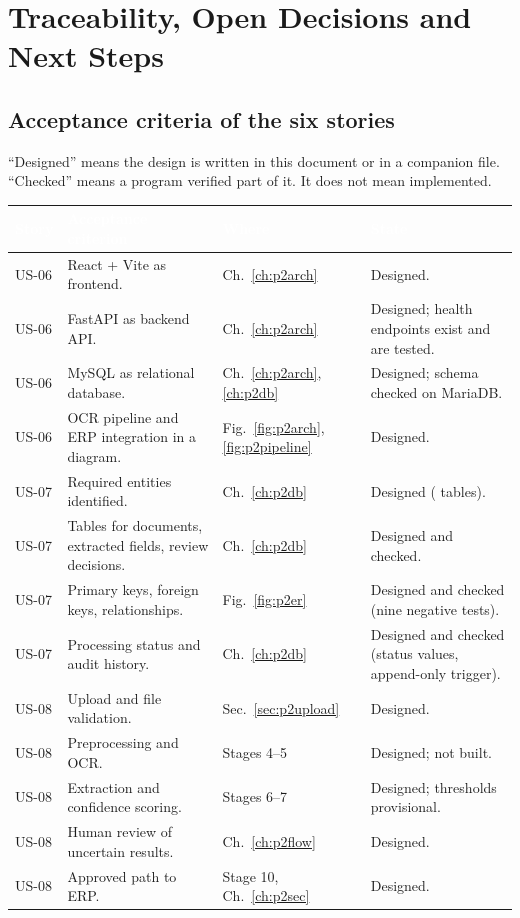 \documentclass[11pt,a4paper]{report}
\newcommand{\hdr}[1]{\textcolor{white}{\sffamily\bfseries #1}}
\newcommand{\tblstart}{\rowcolors{2}{white}{rowgray}\arrayrulecolor{teal!60}}
\newcommand{\hdrrow}{\rowcolor{navy}}
\begin{document}
\chapter{Traceability, Open Decisions and Next Steps}\label{ch:p2trace}
\section{Acceptance criteria of the six stories}
``Designed'' means the design is written in this document or in a companion file. ``Checked'' means a program verified part of it. It does not mean implemented.
{\tblstart\footnotesize
\begin{longtable}{L{1.1cm}L{5.0cm}L{2.0cm}L{5.7cm}}
\hdrrow \hdr{Story} & \hdr{Acceptance criterion} & \hdr{Where} & \hdr{State}\\ \endhead
US-06 & React + Vite as frontend. & Ch.~\ref{ch:p2arch} & Designed.\\
US-06 & FastAPI as backend API. & Ch.~\ref{ch:p2arch} & Designed; health endpoints exist and are tested.\\
US-06 & MySQL as relational database. & Ch.~\ref{ch:p2arch}, \ref{ch:p2db} & Designed; schema checked on MariaDB.\\
US-06 & OCR pipeline and ERP integration in a diagram. & Fig.~\ref{fig:p2arch}, \ref{fig:p2pipeline} & Designed.\\
US-07 & Required entities identified. & Ch.~\ref{ch:p2db} & Designed (\nTables{} tables).\\
US-07 & Tables for documents, extracted fields, review decisions. & Ch.~\ref{ch:p2db} & Designed and checked.\\
US-07 & Primary keys, foreign keys, relationships. & Fig.~\ref{fig:p2er} & Designed and checked (nine negative tests).\\
US-07 & Processing status and audit history. & Ch.~\ref{ch:p2db} & Designed and checked (status values, append-only trigger).\\
US-08 & Upload and file validation. & Sec.~\ref{sec:p2upload} & Designed.\\
US-08 & Preprocessing and OCR. & Stages 4--5 & Designed; not built.\\
US-08 & Extraction and confidence scoring. & Stages 6--7 & Designed; thresholds provisional.\\
US-08 & Human review of uncertain results. & Ch.~\ref{ch:p2flow} & Designed.\\
US-08 & Approved path to ERP. & Stage 10, Ch.~\ref{ch:p2sec} & Designed.\\

\end{longtable}}
\end{document}
